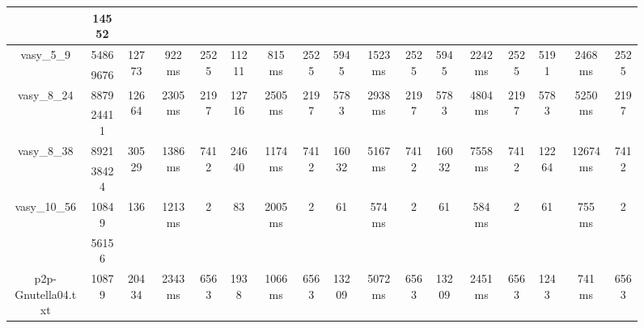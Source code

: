 \documentclass[../master/master.tex]{subfiles}
\begin{document}
\begin{figure}
\begin{tabular}{ |c|c||c|c|c||c|c|c||c|c|c||c|c|c||c|c|c| }
\cline{2-2}
 & 14552  &  &  &  &  &  &  &  &  &  &  &  &  &  &  &  \\
\hline
\multirow{2}{4em}{vasy\_5\_9} & 5486 & \multirow{2}{4em}{12773} & \multirow{2}{4em}{922 ms} & \multirow{2}{4em}{2525} & \multirow{2}{4em}{11211} & \multirow{2}{4em}{815 ms} & \multirow{2}{4em}{2525} & \multirow{2}{4em}{5945} & \multirow{2}{4em}{1523 ms} & \multirow{2}{4em}{2525} & \multirow{2}{4em}{5945} & \multirow{2}{4em}{2242 ms} & \multirow{2}{4em}{2525} & \multirow{2}{4em}{5191} & \multirow{2}{4em}{2468 ms} & \multirow{2}{4em}{2525} \\
\cline{2-2}
 & 9676  &  &  &  &  &  &  &  &  &  &  &  &  &  &  &  \\
\hline
\multirow{2}{4em}{vasy\_8\_24} & 8879 & \multirow{2}{4em}{12664} & \multirow{2}{4em}{2305 ms} & \multirow{2}{4em}{2197} & \multirow{2}{4em}{12716} & \multirow{2}{4em}{2505 ms} & \multirow{2}{4em}{2197} & \multirow{2}{4em}{5783} & \multirow{2}{4em}{2938 ms} & \multirow{2}{4em}{2197} & \multirow{2}{4em}{5783} & \multirow{2}{4em}{4804 ms} & \multirow{2}{4em}{2197} & \multirow{2}{4em}{5783} & \multirow{2}{4em}{5250 ms} & \multirow{2}{4em}{2197} \\
\cline{2-2}
 & 24411  &  &  &  &  &  &  &  &  &  &  &  &  &  &  &  \\
\hline
\multirow{2}{4em}{vasy\_8\_38} & 8921 & \multirow{2}{4em}{30529} & \multirow{2}{4em}{1386 ms} & \multirow{2}{4em}{7412} & \multirow{2}{4em}{24640} & \multirow{2}{4em}{1174 ms} & \multirow{2}{4em}{7412} & \multirow{2}{4em}{16032} & \multirow{2}{4em}{5167 ms} & \multirow{2}{4em}{7412} & \multirow{2}{4em}{16032} & \multirow{2}{4em}{7558 ms} & \multirow{2}{4em}{7412} & \multirow{2}{4em}{12264} & \multirow{2}{4em}{12674 ms} & \multirow{2}{4em}{7412} \\
\cline{2-2}
 & 38424  &  &  &  &  &  &  &  &  &  &  &  &  &  &  &  \\
\hline
\multirow{2}{4em}{vasy\_10\_56} & 10849 & \multirow{2}{4em}{136} & \multirow{2}{4em}{1213 ms} & \multirow{2}{4em}{2} & \multirow{2}{4em}{83} & \multirow{2}{4em}{2005 ms} & \multirow{2}{4em}{2} & \multirow{2}{4em}{61} & \multirow{2}{4em}{574 ms} & \multirow{2}{4em}{2} & \multirow{2}{4em}{61} & \multirow{2}{4em}{584 ms} & \multirow{2}{4em}{2} & \multirow{2}{4em}{61} & \multirow{2}{4em}{755 ms} & \multirow{2}{4em}{2} \\
\cline{2-2}
 & 56156  &  &  &  &  &  &  &  &  &  &  &  &  &  &  &  \\
\hline
\multirow{2}{4em}{p2p-Gnutella04.txt} & 10879 & \multirow{2}{4em}{20434} & \multirow{2}{4em}{2343 ms} & \multirow{2}{4em}{6563} & \multirow{2}{4em}{1938} & \multirow{2}{4em}{1066 ms} & \multirow{2}{4em}{6563} & \multirow{2}{4em}{13209} & \multirow{2}{4em}{5072 ms} & \multirow{2}{4em}{6563} & \multirow{2}{4em}{13209} & \multirow{2}{4em}{2451 ms} & \multirow{2}{4em}{6563} & \multirow{2}{4em}{1243} & \multirow{2}{4em}{741 ms} & \multirow{2}{4em}{6563} \\

\end{tabular}
\end{figure}
\end{document}
